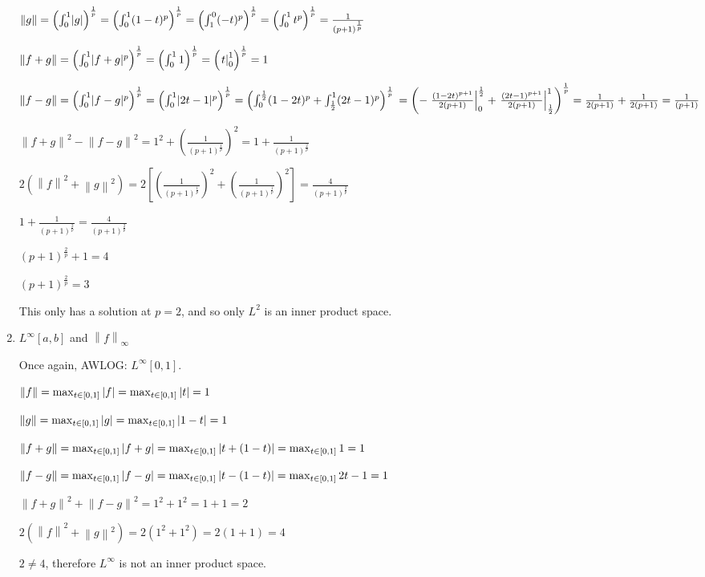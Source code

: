 \documentclass[letterpaper,12pt,fleqn]{article}
\newcommand{\norm}[1]{\left\|#1\right\|}
\begin{document}
\begin{examples}
\begin{enumerate}
    $\norm{g}=\left(\int_0^1\abs{g}\right)^{\frac{1}{p}}=
    \left(\int_0^1(1-t)^p\right)^{\frac{1}{p}}=
    \left(\int_1^0(-t)^p\right)^{\frac{1}{p}}=
    \left(\int_0^1t^p\right)^{\frac{1}{p}}=
    \frac{1}{(p+1)^{\frac{1}{p}}}$

    $\norm{f+g}=\left(\int_0^1\abs{f+g}^p\right)^{\frac{1}{p}}=
    \left(\int_0^11\right)^{\frac{1}{p}}=
    \left(\left.t\right|_0^1\right)^{\frac{1}{p}}=1$

    $\norm{f-g}=\left(\int_0^1\abs{f-g}^p\right)^{\frac{1}{p}}=
    \left(\int_0^1\abs{2t-1}^p\right)^{\frac{1}{p}}=
    \left(\int_0^{\frac{1}{2}}(1-2t)^p+
    \int_{\frac{1}{2}}^1(2t-1)^p\right)^{\frac{1}{p}} \\
    =\left(-\left.\frac{(1-2t)^{p+1}}{2(p+1)}\right|_0^{\frac{1}{2}}+
    \left.\frac{(2t-1)^{p+1}}{2(p+1)}\right|_{\frac{1}{2}}^1
    \right)^{\frac{1}{p}}=\frac{1}{2(p+1)}+\frac{1}{2(p+1)}=\frac{1}{(p+1)}$

    $\norm{f+g}^2-\norm{f-g}^2=1^2+\left(\frac{1}{(p+1)^{\frac{1}{p}}}\right)^2=
    1+\frac{1}{(p+1)^{\frac{2}{p}}}$

    $2(\norm{f}^2+\norm{g}^2)=
    2\left[\left(\frac{1}{(p+1)^{\frac{1}{p}}}\right)^2+
      \left(\frac{1}{(p+1)^{\frac{1}{p}}}\right)^2\right]=
    \frac{4}{(p+1)^{\frac{2}{p}}}$

    $1+\frac{1}{(p+1)^{\frac{2}{p}}}=\frac{4}{(p+1)^{\frac{2}{p}}}$
    
    $(p+1)^{\frac{2}{p}}+1=4$
    
    $(p+1)^{\frac{2}{p}}=3$

    This only has a solution at $p=2$, and so only $L^2$ is an inner product
    space.

    \bigskip

    \newpage

  \item $L^{\infty}[a,b]$ and $\norm{f}_{\infty}$

    Once again, AWLOG: $L^{\infty}[0,1]$.

    $\norm{f}=\max_{t\in[0,1]}{\abs{f}}=\max_{t\in[0,1]}{\abs{t}}=1$

    $\norm{g}=\max_{t\in[0,1]}{\abs{g}}=\max_{t\in[0,1]}{\abs{1-t}}=1$

    $\norm{f+g}=\max_{t\in[0,1]}{\abs{f+g}}=\max_{t\in[0,1]}{\abs{t+(1-t)}}=
    \max_{t\in[0,1]}{1}=1$

    $\norm{f-g}=\max_{t\in[0,1]}{\abs{f-g}}=\max_{t\in[0,1]}{\abs{t-(1-t)}}=
    \max_{t\in[0,1]}{2t-1}=1$

    $\norm{f+g}^2+\norm{f-g}^2=1^2+1^2=1+1=2$

    $2(\norm{f}^2+\norm{g}^2)=2(1^2+1^2)=2(1+1)=4$

    $2\ne4$, therefore $L^{\infty}$ is not an inner product space.
  \end{enumerate}
\end{examples}
\end{document}

